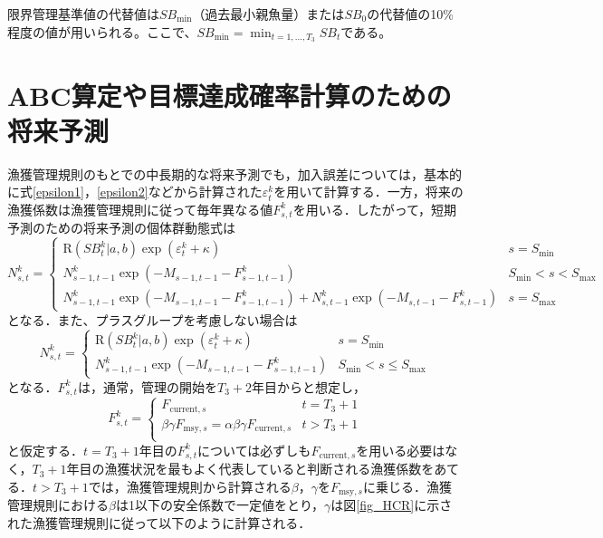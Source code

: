 \documentclass[11pt]{jsarticle}
\begin{document}
限界管理基準値の代替値は$S\!B_{\mathrm{min}}$（過去最小親魚量）または$S\!B_{0}$の代替値の10\%程度の値が用いられる。ここで、$S\!B_{\mathrm{min}}=\min_{t=1,...,T_3}{S\!B_t}$である。

\section{ABC算定や目標達成確率計算のための将来予測}
漁獲管理規則のもとでの中長期的な将来予測でも，加入誤差については，基本的に式\ref{epsilon1}，\ref{epsilon2}などから計算された$\varepsilon_t^k$を用いて計算する．一方，将来の漁獲係数は漁獲管理規則に従って毎年異なる値$F_{s,t}^k$を用いる．したがって，短期予測のための将来予測の個体群動態式は
\begin{equation}
  N_{s,t}^k = \begin{cases}
    \mathrm{R}(S\!B_{t}^k|a,b) \exp (\varepsilon_t^k + \kappa) &     s = S_\mathrm{min} \\    
    N_{s-1, t-1}^k  \exp(-M_{s-1,t-1}- F_{s-1,t-1}^k )  &    S_\mathrm{min} < s < S_\mathrm{max} \\
    N_{s-1, t-1}^k  \exp(-M_{s-1,t-1}- F_{s-1,t-1}^k ) + N_{s,t-1}^k  \exp(-M_{s,t-1} - F_{s,t-1}^k) &   s=S_{\mathrm{max}}
  \end{cases}
  \label{future_eq3}
\end{equation}
となる．また、プラスグループを考慮しない場合は
\begin{equation}
  N_{s,t}^k = \begin{cases}
    \mathrm{R}(S\!B_{t}^k|a,b) \exp (\varepsilon_t^k + \kappa) &     s = S_\mathrm{min} \\    
    N_{s-1, t-1}^k  \exp(-M_{s-1,t-1}- F_{s-1,t-1}^k )  &    S_\mathrm{min} < s \leq S_\mathrm{max}
  \end{cases}
  \label{future_eq3_no_plus}
\end{equation}
となる．$F_{s,t}^k$は，通常，管理の開始を$T_{3}+2$年目からと想定し，
\begin{equation}
  F_{s,t}^k = \begin{cases}
   F_{\mathrm{current},s} &     t = T_3+1 \\    
   \beta \gamma  F_{\mathrm{msy},s} = \alpha \beta \gamma F_{\mathrm{current},s}
   &     t > T_3+1 \\
  \end{cases}
  \label{future_eq4}
\end{equation}
と仮定する．$t=T_3+1$年目の$F_{s,t}^k$については必ずしも$F_{\mathrm{current},s}$を用いる必要はなく，$T_3+1$年目の漁獲状況を最もよく代表していると判断される漁獲係数をあてる．$t>T_3+1$では，漁獲管理規則から計算される$\beta$，$\gamma$を$F_{\mathrm{msy},s}$に乗じる．漁獲管理規則における$\beta$は1以下の安全係数で一定値をとり，$\gamma$は図\ref{fig_HCR}に示された漁獲管理規則に従って以下のように計算される．
\end{document}
